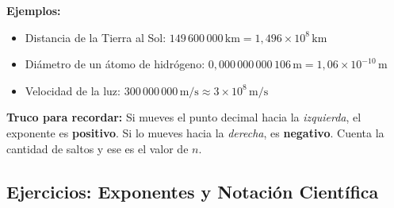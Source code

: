 \documentclass[12pt, letterpaper]{article}
\begin{document}
\noindent\textbf{Ejemplos:}
\begin{itemize}
  \item Distancia de la Tierra al Sol: $149\,600\,000\,\text{km} = 1{,}496 \times 10^8\,\text{km}$
  \item Diámetro de un átomo de hidrógeno: $0{,}000\,000\,000\,106\,\text{m} = 1{,}06 \times 10^{-10}\,\text{m}$
  \item Velocidad de la luz: $300\,000\,000\,\text{m/s} \approx 3 \times 10^8\,\text{m/s}$
\end{itemize}

\begin{cuadroadvertencia}
  \textbf{Truco para recordar:} Si mueves el punto decimal hacia la \emph{izquierda}, el exponente es \textbf{positivo}. Si lo mueves hacia la \emph{derecha}, es \textbf{negativo}. Cuenta la cantidad de saltos y ese es el valor de $n$.
\end{cuadroadvertencia}


\subsection{Ejercicios: Exponentes y Notación Científica}
\end{document}
